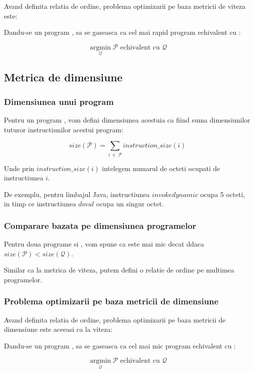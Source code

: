 Avand definita relatia de ordine, problema optimizarii pe
baza metricii de viteza este:

Dandu-se un program , sa se gaseasca  ca cel mai rapid
program echivalent cu :

\[
    \operatorname*{argmin}_\mathcal{Q} \mathcal{P}
    \text{ echivalent cu  } \mathcal{Q}
\]

\subsection{Metrica de dimensiune}

\subsubsection{Dimensiunea unui program}

Pentru un program , vom defini dimensiunea acestuia ca fiind
suma dimensiunilor tuturor instructiunilor acestui program:

\[
    size(\mathcal{P}) = \sum_{i\ \in\ \mathcal{P}} instruction\_size(i)
\]

Unde prin \( instruction\_size(i) \) intelegem numarul de octeti
ocupati de instructiunea $i$.

De exemplu, pentru limbajul Java, instructiunea $invokedynamic$
ocupa 5 octeti, in timp ce instructiunea $dmul$ ocupa un singur
octet.

\subsubsection{Comparare bazata pe dimensiunea programelor}

Pentru doua programe  si , vom spune ca  este mai
mic decat  ddaca \(size(\mathcal{P}) < size(\mathcal{Q})\).

Similar ca la metrica de viteza, putem defini o relatie de ordine
pe multimea programelor.

\subsubsection{Problema optimizarii pe baza metricii de
dimensiune}

Avand definita relatia de ordine, problema optimizarii pe
baza metricii de dimensiune este aceeasi ca la viteza:

Dandu-se un program , sa se gaseasca  ca cel mai mic
program echivalent cu :

\[
    \operatorname*{argmin}_\mathcal{Q} \mathcal{P}
    \text{ echivalent cu  } \mathcal{Q}
\]

